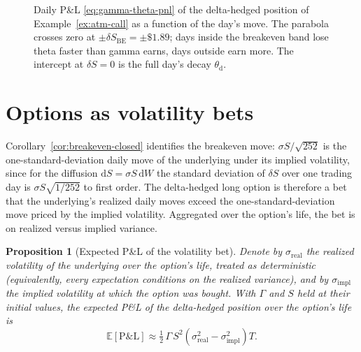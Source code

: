 \documentclass[11pt]{book}
\theoremstyle{plain}
\newtheorem{proposition}[theorem]{Proposition}
\theoremstyle{definition}
\theoremstyle{remark}
\newcommand{\dd}{\mathrm{d}}                                  %
\newcommand{\E}{\mathbb{E}}
\begin{document}
\begin{figure}[t]
\centering
{}
\caption{Daily P\&L \eqref{eq:gamma-theta-pnl} of the delta-hedged position of Example~\ref{ex:atm-call} as a function of the day's move. The parabola crosses zero at $\pm\delta S_{\mathrm{BE}} = \pm\$1.89$; days inside the breakeven band lose theta faster than gamma earns, days outside earn more. The intercept at $\delta S = 0$ is the full day's decay $\theta_{\mathrm d}$.}
\label{fig:breakeven}
\end{figure}

\section{Options as volatility bets}
\label{sec:vol-bets}

Corollary~\ref{cor:breakeven-closed} identifies the breakeven move: $\sigma S / \sqrt{252}$ is the one-standard-deviation daily move of the underlying under its implied volatility, since for the diffusion $\dd S = \sigma S\,\dd W$ the standard deviation of $\delta S$ over one trading day is $\sigma S \sqrt{1/252}$ to first order. The delta-hedged long option is therefore a bet that the underlying's realized daily moves exceed the one-standard-deviation move priced by the implied volatility. Aggregated over the option's life, the bet is on realized versus implied variance.

\begin{proposition}[Expected P\&L of the volatility bet]
\label{prop:vol-bet}
Denote by $\sigma_{\mathrm{real}}$ the realized volatility of the underlying over the option's life, treated as deterministic (equivalently, every expectation conditions on the realized variance), and by $\sigma_{\mathrm{impl}}$ the implied volatility at which the option was bought. With $\Gamma$ and $S$ held at their initial values, the expected P\&L of the delta-hedged position over the option's life is
\begin{equation}
\E[\mathrm{P\&L}] \approx \tfrac12\,\Gamma\,S^2\left(\sigma_{\mathrm{real}}^2 - \sigma_{\mathrm{impl}}^2\right) T .
\label{eq:vol-bet}
\end{equation}
\end{proposition}
\end{document}
